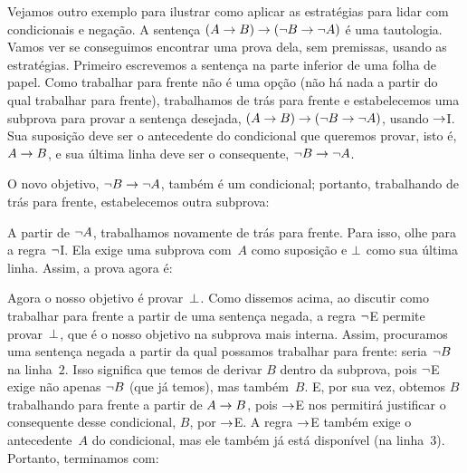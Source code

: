 Vejamos outro exemplo para ilustrar como aplicar as estratégias
para lidar com condicionais e negação. A sentença $(A \rightarrow B) \rightarrow
(\neg B \rightarrow \neg A)$ é uma tautologia. Vamos ver se conseguimos encontrar uma
prova dela, sem premissas, usando as estratégias. Primeiro escrevemos
a sentença na parte inferior de uma folha de papel. Como trabalhar para frente
não é uma opção (não há nada a partir do qual trabalhar para frente), trabalhamos
de trás para frente e estabelecemos uma subprova para provar a sentença desejada, $(A
\rightarrow B) \rightarrow (\neg B \rightarrow \neg A)$, usando $\rightarrow$I. Sua suposição
deve ser o antecedente do condicional que queremos provar, isto é, $A
\rightarrow B$, e sua última linha deve ser o consequente, $\neg B \rightarrow \neg A$.
\begin{fitchproof}
\open
{}\AS
\ellipsesline
{}
\close
{}
\end{fitchproof}
O novo objetivo, $\neg B \rightarrow \neg A$, também é um condicional; portanto, trabalhando de trás para frente, estabelecemos outra subprova:
\begin{fitchproof}
	\open
	\AS
	\open
	\AS
	\ellipsesline
	\close
	\close
\end{fitchproof}
A partir de $\neg A$, trabalhamos novamente de trás para frente. Para isso, olhe para a regra $\neg$I. Ela exige uma subprova com~$A$ como suposição e $\bot$ como sua última linha. Assim, a prova agora é:
\begin{fitchproof}
	\open
	\AS
	\open
	\AS
	\open{}
	\ellipsesline
	\close
	\close
	\close
\end{fitchproof}
Agora o nosso objetivo é provar~$\bot$. Como dissemos acima, ao discutir
como trabalhar para frente a partir de uma sentença negada, a regra $\neg$E permite
provar~$\bot$, que é o nosso objetivo na subprova mais interna. Assim,
procuramos uma sentença negada a partir da qual possamos trabalhar para frente:
seria $\neg B$ na linha~$2$. Isso significa que temos de derivar $B$
dentro da subprova, pois $\neg$E exige não apenas $\neg B$ (que já
temos), mas também~$B$. E, por sua vez, obtemos $B$ trabalhando para
frente a partir de $A \rightarrow B$, pois $\rightarrow$E nos permitirá justificar o
consequente desse condicional, $B$, por $\rightarrow$E. A regra $\rightarrow$E também
exige o antecedente~$A$ do condicional, mas ele também já está
disponível (na linha~$3$). Portanto, terminamos com:
\begin{fitchproof}
	\open
	\AS
	\open
	\AS
	\open{}
	\close
	\close
	\close
\end{fitchproof}

